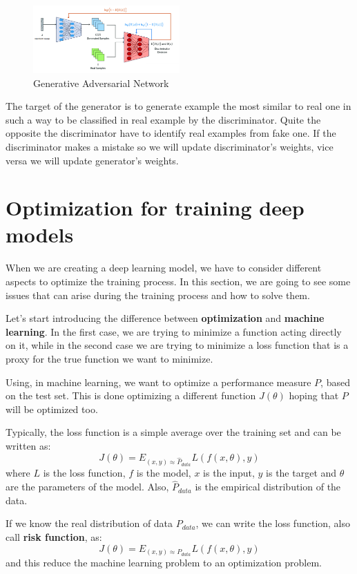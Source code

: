\begin{figure}[!ht]
    \centering
    \includegraphics[width=0.5\textwidth]{img/GAN.png}
    \caption{Generative Adversarial Network}
    \label{fig:gan}
\end{figure}

The target of the generator is to generate example the most similar to real one
in such a way to be classified in real example by the discriminator. Quite the
opposite the discriminator have to identify real examples from fake one. If the
discriminator makes a mistake so we will update discriminator's weights, vice
versa we will update generator's weights.
\section{Optimization for training deep models}
When we are creating a deep learning model, we have to consider different aspects
to optimize the training process. In this section, we are going to see some
issues that can arise during the training process and how to solve them.

Let's start introducing the difference between \textbf{optimization} and
\textbf{machine learning}. In the first case, we are trying to minimize a function
acting directly on it, while in the second case we are trying to minimize a loss
function that is a proxy for the true function we want to minimize.

Using, in machine learning, we want to optimize a performance measure $P$, based
on the test set. This is done optimizing a different function $J(\theta)$ hoping
that $P$ will be optimized too.

Typically, the loss function is a simple average over the training set and can be
written as:
\begin{equation}
    J(\theta) = E_{(x, y) \approx \hat{P}_{data}} L(f(x, \theta), y)
\end{equation}
where $L$ is the loss function, $f$ is the model, $x$ is the input, $y$ is the
target and $\theta$ are the parameters of the model. Also, $\hat{P}_{data}$ is
the empirical distribution of the data.

If we know the real distribution of data $P_{data}$, we can write the loss
function, also call \textbf{risk function}, as:
\begin{equation}
    J(\theta) = E_{(x, y) \approx P_{data}} L(f(x, \theta), y)
\end{equation}
and this reduce the machine learning problem to an optimization problem.

